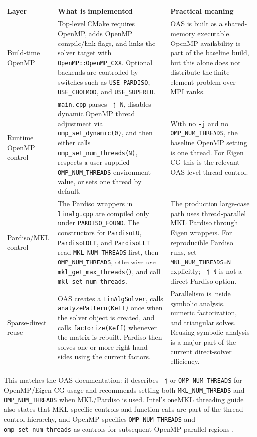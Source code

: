 \documentclass[10pt,a4paper]{article}
\newcommand{\code}[1]{\texttt{#1}}
\begin{document}
\begin{table}[h]
\small
\centering
\begin{tabularx}{\textwidth}{L{0.24\textwidth} L{0.30\textwidth} Y}
\toprule
Layer & What is implemented & Practical meaning \\
\midrule
Build-time OpenMP & Top-level CMake requires OpenMP, adds OpenMP compile/link flags, and links the solver target with \code{OpenMP::OpenMP\_CXX}. Optional backends are controlled by switches such as \code{USE\_PARDISO}, \code{USE\_CHOLMOD}, and \code{USE\_SUPERLU}. & OAS is built as a shared-memory executable. OpenMP availability is part of the baseline build, but this alone does not distribute the finite-element problem over MPI ranks. \\
\addlinespace
Runtime OpenMP control & \code{main.cpp} parses \code{-j N}, disables dynamic OpenMP thread adjustment via \code{omp\_set\_dynamic(0)}, and then either calls \code{omp\_set\_num\_threads(N)}, respects a user-supplied \code{OMP\_NUM\_THREADS} environment value, or sets one thread by default. & With no \code{-j} and no \code{OMP\_NUM\_THREADS}, the baseline OpenMP setting is one thread. For Eigen CG this is the relevant OAS-level thread control. \\
\addlinespace
Pardiso/MKL control & The Pardiso wrappers in \code{linalg.cpp} are compiled only under \code{PARDISO\_FOUND}. The constructors for \code{PardisoLU}, \code{PardisoLDLT}, and \code{PardisoLLT} read \code{MKL\_NUM\_THREADS} first, then \code{OMP\_NUM\_THREADS}, otherwise use \code{mkl\_get\_max\_threads()}, and call \code{mkl\_set\_num\_threads}. & The production large-case path uses thread-parallel MKL Pardiso through Eigen wrappers. For reproducible Pardiso runs, set \code{MKL\_NUM\_THREADS=N} explicitly; \code{-j N} is not a direct Pardiso option. \\
\addlinespace
Sparse-direct reuse & OAS creates a \code{LinAlgSolver}, calls \code{analyzePattern(Keff)} once when the solver object is created, and calls \code{factorize(Keff)} whenever the matrix is rebuilt. Pardiso then solves one or more right-hand sides using the current factors. & Parallelism is inside symbolic analysis, numeric factorization, and triangular solves. Reusing symbolic analysis is a major part of the current direct-solver efficiency. \\
\bottomrule
\end{tabularx}
\end{table}

This matches the OAS documentation: it describes \code{-j} or \code{OMP\_NUM\_THREADS} for OpenMP/Eigen CG usage and recommends setting both \code{MKL\_NUM\_THREADS} and \code{OMP\_NUM\_THREADS} when MKL/Pardiso is used. Intel's oneMKL threading guide also states that MKL-specific controls and function calls are part of the thread-control hierarchy, and OpenMP specifies \code{OMP\_NUM\_THREADS} and \code{omp\_set\_num\_threads} as controls for subsequent OpenMP parallel regions \cite{oasdocs,oasmain,oaslinalg,mklthreads,openmpthreads}.
\end{document}
